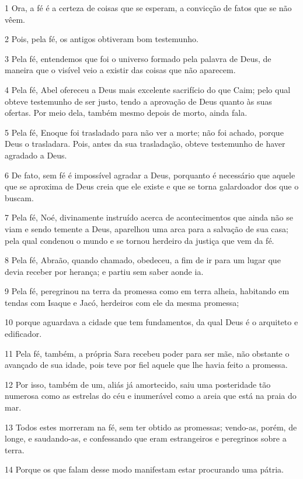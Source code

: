 \par 1 Ora, a fé é a certeza de coisas que se esperam, a convicção de fatos que se não vêem.
\par 2 Pois, pela fé, os antigos obtiveram bom testemunho.
\par 3 Pela fé, entendemos que foi o universo formado pela palavra de Deus, de maneira que o visível veio a existir das coisas que não aparecem.
\par 4 Pela fé, Abel ofereceu a Deus mais excelente sacrifício do que Caim; pelo qual obteve testemunho de ser justo, tendo a aprovação de Deus quanto às suas ofertas. Por meio dela, também mesmo depois de morto, ainda fala.
\par 5 Pela fé, Enoque foi trasladado para não ver a morte; não foi achado, porque Deus o trasladara. Pois, antes da sua trasladação, obteve testemunho de haver agradado a Deus.
\par 6 De fato, sem fé é impossível agradar a Deus, porquanto é necessário que aquele que se aproxima de Deus creia que ele existe e que se torna galardoador dos que o buscam.
\par 7 Pela fé, Noé, divinamente instruído acerca de acontecimentos que ainda não se viam e sendo temente a Deus, aparelhou uma arca para a salvação de sua casa; pela qual condenou o mundo e se tornou herdeiro da justiça que vem da fé.
\par 8 Pela fé, Abraão, quando chamado, obedeceu, a fim de ir para um lugar que devia receber por herança; e partiu sem saber aonde ia.
\par 9 Pela fé, peregrinou na terra da promessa como em terra alheia, habitando em tendas com Isaque e Jacó, herdeiros com ele da mesma promessa;
\par 10 porque aguardava a cidade que tem fundamentos, da qual Deus é o arquiteto e edificador.
\par 11 Pela fé, também, a própria Sara recebeu poder para ser mãe, não obstante o avançado de sua idade, pois teve por fiel aquele que lhe havia feito a promessa.
\par 12 Por isso, também de um, aliás já amortecido, saiu uma posteridade tão numerosa como as estrelas do céu e inumerável como a areia que está na praia do mar.
\par 13 Todos estes morreram na fé, sem ter obtido as promessas; vendo-as, porém, de longe, e saudando-as, e confessando que eram estrangeiros e peregrinos sobre a terra.
\par 14 Porque os que falam desse modo manifestam estar procurando uma pátria.
